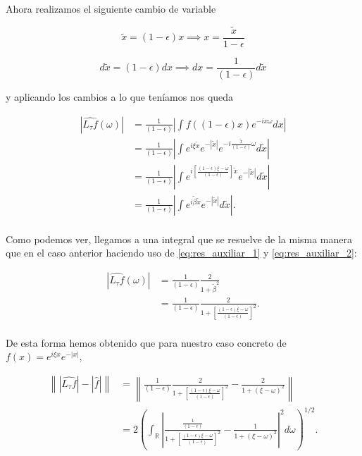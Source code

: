   \noindent Ahora realizamos el siguiente cambio de variable

  \begin{equation}
    \tilde{x}=(1-\epsilon) x \implies x=\frac{\tilde{x}}{1-\epsilon} 
  \end{equation}

  \begin{equation}
  d\tilde{x}=(1-\epsilon) dx \implies dx=\frac{1}{(1-\epsilon)}d\tilde{x}
  \end{equation}

  \noindent y aplicando los cambios a lo que teníamos nos queda

  \begin{align*}
    |\widehat{L_\tau f}(\omega)| 
    &= \frac{1}{(1-\epsilon)}\left|  \int{f((1-\epsilon)x)e^{-ix\omega}dx}  \right | \\
    &=\frac{1}{(1-\epsilon)}\left|  \int{e^{i \xi \tilde{x}}e^{-|\tilde{x}|}e^{-i\frac{\tilde{x}}{(1-\epsilon)}\omega}d\tilde{x}}  \right | \\
    &=\frac{1}{(1-\epsilon)}\left|  \int{e^{i \left[ \frac{(1-\epsilon) \xi - \omega}{(1-\epsilon)}\right]\tilde{x}}e^{-|\tilde{x}|} d\tilde{x}}  \right | \\
    &=\frac{1}{(1-\epsilon)}\left|  \int{e^{i \tilde{\beta}\tilde{x}}e^{-|\tilde{x}|} d\tilde{x}}  \right |. \\
  \end{align*}

  \noindent Como podemos ver, llegamos a una integral que se resuelve de la misma manera que en el caso anterior haciendo uso de \eqref{eq:res_auxiliar_1} y \eqref{eq:res_auxiliar_2}:

  \begin{align*}
    |\widehat{L_\tau f}(\omega)| 
    &= \frac{1}{(1-\epsilon)} \frac{2}{1+\tilde{\beta}^2} \\
    &= \frac{1}{(1-\epsilon)} \frac{2}{1+\left[ \frac{(1-\epsilon) \xi - \omega}{(1-\epsilon)}\right]^2}. \\
  \end{align*}


  \noindent De esta forma hemos obtenido que para nuestro caso concreto de $f(x)=e^{i \xi x}e^{-|x|}$,


  \begin{align*}
    \left\| |\widehat{L_\tau f}|-|\widehat{f}| \right\| &= \left\| \frac{1}{(1-\epsilon)} \frac{2}{1+\left[ \frac{(1-\epsilon) \xi - \omega}{(1-\epsilon)}\right]^2}-\frac{2}{1+(\xi - \omega)^2} \right\| \\
    &= 2 \left(\int_{\mathbb{R}} \left| \frac{\frac{1}{(1-\epsilon)}}{1+\left[ \frac{(1-\epsilon) \xi - \omega}{(1-\epsilon)}\right]^2}-\frac{1}{1+(\xi - \omega)^2} \right|^2 d\omega\right)^{1/2}.
  \end{align*}


